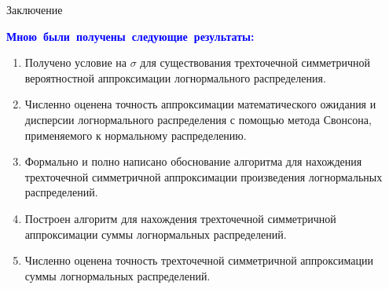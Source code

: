 \documentclass[ucs, notheorems, handout]{beamer}
\begin{document}
	\begin{frame}{Заключение}

		\textcolor{blue}{\hbox{\textbf{Мною были получены следующие результаты:}}}
		\begin{enumerate}
			\item Получено условие на $\sigma$ для существования трехточечной симметричной вероятностной аппроксимации логнормального распределения.
			\item Численно оценена точность аппроксимации математического ожидания и дисперсии логнормального распределения с помощью метода Свонсона, применяемого к нормальному распределению.
			\item Формально и полно написано обоснование алгоритма для нахождения трехточечной симметричной аппроксимации произведения логнормальных распределений.
			\item Построен алгоритм для нахождения трехточечной симметричной аппроксимации суммы логнормальных распределений.
			\item Численно оценена точность трехточечной симметричной аппроксимации суммы логнормальных распределений.
		\end{enumerate}
		
		
	\end{frame}

	
\end{document}
